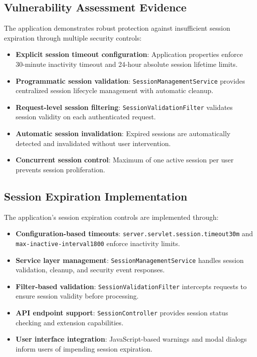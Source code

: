 \documentclass[]{UCD_CS_FYP_Report}
\begin{document}
\subsection{Vulnerability Assessment Evidence}
The application demonstrates robust protection against insufficient session expiration through multiple security controls:
\begin{itemize}
	\item \textbf{Explicit session timeout configuration}: Application properties enforce 30-minute inactivity timeout and 24-hour absolute session lifetime limits.
	\item \textbf{Programmatic session validation}: \texttt{SessionManagementService} provides centralized session lifecycle management with automatic cleanup.
	\item \textbf{Request-level session filtering}: \texttt{SessionValidationFilter} validates session validity on each authenticated request.
	\item \textbf{Automatic session invalidation}: Expired sessions are automatically detected and invalidated without user intervention.
	\item \textbf{Concurrent session control}: Maximum of one active session per user prevents session proliferation.
\end{itemize}

\subsection{Session Expiration Implementation}
The application's session expiration controls are implemented through:
\begin{itemize}
	\item \textbf{Configuration-based timeouts}: \texttt{server.servlet.session.timeout\=30m} and \texttt{max-inactive-interval\=1800} enforce inactivity limits.
	\item \textbf{Service layer management}: \texttt{SessionManagementService} handles session validation, cleanup, and security event responses.
	\item \textbf{Filter-based validation}: \texttt{SessionValidationFilter} intercepts requests to ensure session validity before processing.
	\item \textbf{API endpoint support}: \texttt{SessionController} provides session status checking and extension capabilities.
	\item \textbf{User interface integration}: JavaScript-based warnings and modal dialogs inform users of impending session expiration.
\end{itemize}
\end{document}

